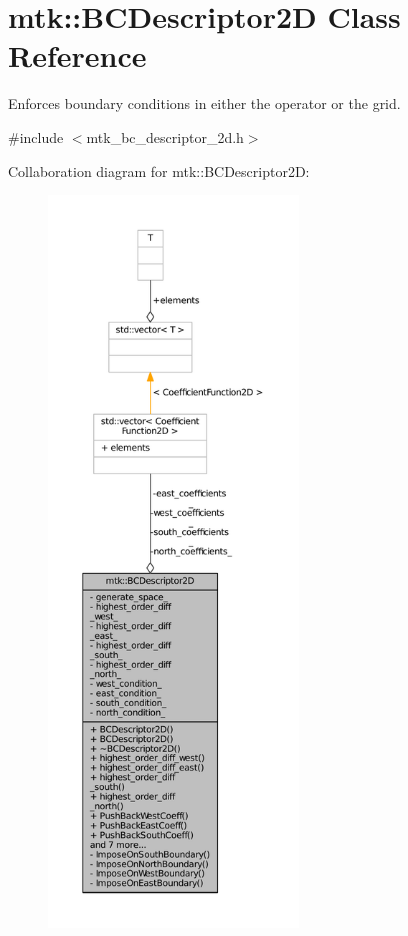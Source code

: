 \hypertarget{classmtk_1_1BCDescriptor2D}{\section{mtk\+:\+:B\+C\+Descriptor2\+D Class Reference}
\label{classmtk_1_1BCDescriptor2D}
}


Enforces boundary conditions in either the operator or the grid.  




{\ttfamily \#include $<$mtk\+\_\+bc\+\_\+descriptor\+\_\+2d.\+h$>$}



Collaboration diagram for mtk\+:\+:B\+C\+Descriptor2\+D\+:\nopagebreak
\begin{figure}[H]
\begin{center}
\leavevmode
\includegraphics[height=550pt]{classmtk_1_1BCDescriptor2D__coll__graph}
\end{center}
\end{figure}
